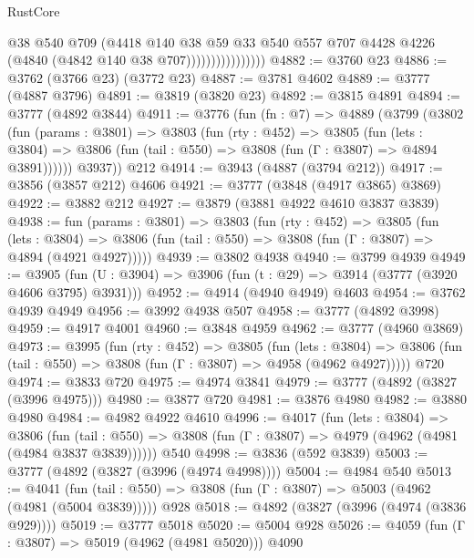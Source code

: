 \begin{lexlean}{RustCore}
\begin{coremodule}
                              @38
                              @540
                              @709
                              (@4418
                                @140
                                @38
                                @59
                                @33
                                @540
                                @557
                                @707
                                @4428
                                @4226
                                (@4840 (@4842 @140 @38 @707))))))))))))))))
@4882 := @3760 @23
@4886 := @3762 (@3766 @23) (@3772 @23)
@4887 := @3781 @4602
@4889 := @3777 (@4887 @3796)
@4891 := @3819 (@3820 @23)
@4892 := @3815 @4891
@4894 := @3777 (@4892 @3844)
@4911 := @3776
    (fun (fn : @7) =>
    @4889
      (@3799
        (@3802
          (fun (params : @3801) =>
          @3803
            (fun (rty : @452) =>
            @3805
              (fun (lets : @3804) =>
              @3806 (fun (tail : @550) => @3808 (fun (Γ : @3807) => @4894 @3891))))))
        @3937))
    @212
@4914 := @3943 (@4887 (@3794 @212))
@4917 := @3856 (@3857 @212) @4606
@4921 := @3777 (@3848 (@4917 @3865) @3869)
@4922 := @3882 @212
@4927 := @3879 (@3881 @4922 @4610 @3837 @3839)
@4938 := fun (params : @3801) =>
  @3803
    (fun (rty : @452) =>
    @3805
      (fun (lets : @3804) =>
      @3806 (fun (tail : @550) => @3808 (fun (Γ : @3807) => @4894 (@4921 @4927)))))
@4939 := @3802 @4938
@4940 := @3799 @4939
@4949 := @3905 (fun (U : @3904) => @3906 (fun (t : @29) => @3914 (@3777 (@3920 @4606 @3795) @3931)))
@4952 := @4914 (@4940 @4949) @4603
@4954 := @3762 @4939 @4949
@4956 := @3992 @4938 @507
@4958 := @3777 (@4892 @3998)
@4959 := @4917 @4001
@4960 := @3848 @4959
@4962 := @3777 (@4960 @3869)
@4973 := @3995
    (fun (rty : @452) =>
    @3805
      (fun (lets : @3804) =>
      @3806 (fun (tail : @550) => @3808 (fun (Γ : @3807) => @4958 (@4962 @4927)))))
    @720
@4974 := @3833 @720
@4975 := @4974 @3841
@4979 := @3777 (@4892 (@3827 (@3996 @4975)))
@4980 := @3877 @720
@4981 := @3876 @4980
@4982 := @3880 @4980
@4984 := @4982 @4922 @4610
@4996 := @4017
    (fun (lets : @3804) =>
    @3806
      (fun (tail : @550) => @3808 (fun (Γ : @3807) => @4979 (@4962 (@4981 (@4984 @3837 @3839))))))
    @540
@4998 := @3836 (@592 @3839)
@5003 := @3777 (@4892 (@3827 (@3996 (@4974 @4998))))
@5004 := @4984 @540
@5013 := @4041
    (fun (tail : @550) => @3808 (fun (Γ : @3807) => @5003 (@4962 (@4981 (@5004 @3839)))))
    @928
@5018 := @4892 (@3827 (@3996 (@4974 (@3836 @929))))
@5019 := @3777 @5018
@5020 := @5004 @928
@5026 := @4059 (fun (Γ : @3807) => @5019 (@4962 (@4981 @5020))) @4090

\end{coremodule}
\end{lexlean}
